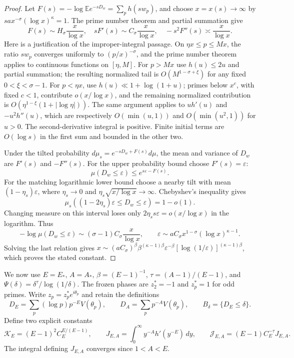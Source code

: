 \documentclass[11pt,letterpaper]{article}
\theoremstyle{definition}
\theoremstyle{remark}
\newcommand{\1}{\mathbf 1}
\begin{document}
\begin{proof}
Let $F(s)=-\log\mathbb E e^{-sD_w}=\sum_p h(sw_p)$, and choose
$x=x(s)\to\infty$ by $sa x^{-\sigma}(\log x)^\kappa=1$.
The prime number theorem and partial summation give
\begin{equation}\label{p04:eq:saddle-prime-sums}
 F(s)\sim H_\sigma\frac{x}{\log x},\quad
 sF'(s)\sim C_\sigma\frac{x}{\log x},\quad
 -s^2F''(s)\asymp\frac{x}{\log x}.
\end{equation}
Here is a justification of the improper-integral passage. On
$\eta x\le p\le Mx$, the ratio $sw_p$ converges uniformly to
$(p/x)^{-\sigma}$, and the prime number theorem applies to continuous
functions on $[\eta,M]$. For $p>Mx$ use $h(u)\le2u$ and partial
summation; the resulting normalized tail is
$O(M^{1-\sigma+\xi})$ for any fixed $0<\xi<\sigma-1$.
For $p<\eta x$, use $h(u)\ll1+\log(1+u)$; primes below $x^c$,
with fixed $c<1$, contribute $o(x/\log x)$, and the remaining
normalized contribution is $O(\eta^{1-\xi}(1+|\log\eta|))$.
The same argument applies to $uh'(u)$ and $-u^2h''(u)$, which are
respectively $O(\min(u,1))$ and $O(\min(u^2,1))$ for $u>0$.
The second-derivative integral is positive. Finite initial terms
are $O(\log s)$ in the first sum and bounded in the other two.

Under the tilted probability $d\mu_s=e^{-sD_w+F(s)}d\mu$, the
mean and variance of $D_w$ are $F'(s)$ and $-F''(s)$.
For the upper probability bound choose $F'(s)=\varepsilon$:
\[
 \mu(D_w\le\varepsilon)\le e^{s\varepsilon-F(s)}.
\]
For the matching logarithmic lower bound choose a nearby tilt with
mean $(1-\eta_s)\varepsilon$, where $\eta_s\to0$ and
$\eta_s\sqrt{x/\log x}\to\infty$. Chebyshev's inequality gives
\[
 \mu_s((1-2\eta_s)\varepsilon\le D_w\le\varepsilon)=1-o(1).
\]
Changing measure on this interval loses only
$2\eta_s s\varepsilon=o(x/\log x)$ in the logarithm. Thus
\[
 -\log\mu(D_w\le\varepsilon)
 \sim (\sigma-1)C_\sigma\frac{x}{\log x},\qquad
 \varepsilon\sim aC_\sigma
 x^{1-\sigma}(\log x)^{\kappa-1}.
\]
Solving the last relation gives
$x\sim(aC_\sigma)^\beta\beta^{(\kappa-1)\beta}
\varepsilon^{-\beta}[\log(1/\varepsilon)]^{(\kappa-1)\beta}$,
which proves the stated constant.
\end{proof}

We now use $E=E_*$, $A=A_*$, $\beta=(E-1)^{-1}$,
$\tau=(A-1)/(E-1)$, and
$\Psi(\delta)=\delta^\tau/\log(1/\delta)$.
The frozen phases are $z_2^*=-1$ and $z_p^*=1$ for odd primes.
Write $z_p=z_p^*e^{i\theta_p}$ and retain the definitions
\[
 D_E=\sum_p(\log p)p^{-E}V(\theta_p),\qquad
 D_A=\sum_pp^{-A}V(\theta_p),\qquad B_\delta=\{D_E\le\delta\}.
\]
Define two explicit constants
\begin{equation}\label{p04:eq:joint-edge-constants}
 \mathcal K_E=(E-1)^2 C_E^{E/(E-1)},\qquad
 J_{E,A}=\int_0^\infty y^{-A}h'(y^{-E})\,dy,\qquad
 \mathcal J_{E,A}=(E-1)C_E^{-\tau}J_{E,A}.
\end{equation}
The integral defining $J_{E,A}$ converges since $1<A<E$.
\end{document}
